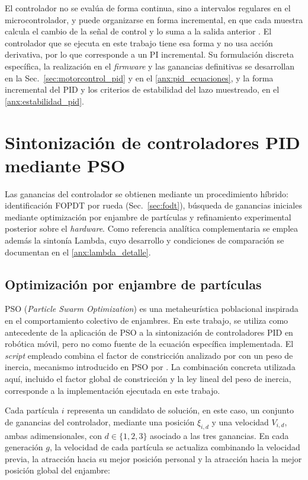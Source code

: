 El controlador no se evalúa de forma continua, sino a intervalos regulares en
el microcontrolador, y puede organizarse en forma incremental, en que cada
muestra calcula el cambio de la señal de control y lo suma a la salida anterior
\citep[Sec.~13.4]{astrom2009controlpid}. El controlador que se ejecuta en este
trabajo tiene esa forma y no usa acción derivativa, por lo que corresponde a un
PI incremental. Su formulación discreta específica, la
realización en el \textit{firmware} y las ganancias definitivas se desarrollan
en la Sec.~\ref{sec:motorcontrol_pid} y en el \ref{anx:pid_ecuaciones}, y la
forma incremental del PID y los criterios de estabilidad del lazo muestreado,
en el \ref{anx:estabilidad_pid}.

\section{Sintonización de controladores PID mediante PSO}
\label{sec:sintonizacion}

Las ganancias del controlador se obtienen mediante un procedimiento híbrido:
identificación FOPDT por rueda (Sec.~\ref{sec:fodt}), búsqueda de ganancias
iniciales mediante optimización por enjambre de partículas y refinamiento
experimental posterior sobre el \textit{hardware}. Como referencia analítica
complementaria se emplea además la sintonía Lambda, cuyo desarrollo y
condiciones de comparación se documentan en el \ref{anx:lambda_detalle}.

\subsection{Optimización por enjambre de partículas}
\label{sec:pso_marco}

PSO (\textit{Particle Swarm Optimization}) es una metaheurística
poblacional inspirada en el comportamiento colectivo de enjambres. En este
trabajo, \citet{gokcce2021particle} se utiliza como antecedente de la
aplicación de PSO a la sintonización de controladores PID en robótica móvil,
pero no como fuente de la ecuación específica implementada. El \textit{script} empleado
combina el factor de constricción analizado por \citet{clerc2002particle} con
un peso de inercia, mecanismo introducido en PSO por
\citet{shi1998modified}. La combinación concreta utilizada aquí, incluido el
factor global de constricción y la ley lineal del peso de inercia, corresponde
a la implementación ejecutada en este trabajo.

Cada partícula $i$ representa un candidato de solución, en este caso, un
conjunto de ganancias del controlador, mediante una posición $\xi_{i,d}$ y una
velocidad $V_{i,d}$, ambas adimensionales, con $d\in\{1,2,3\}$ asociado a
las tres ganancias. En cada generación $g$, la velocidad de cada partícula se
actualiza combinando la velocidad previa, la atracción hacia su mejor posición
personal y la atracción hacia la mejor posición global del enjambre:

